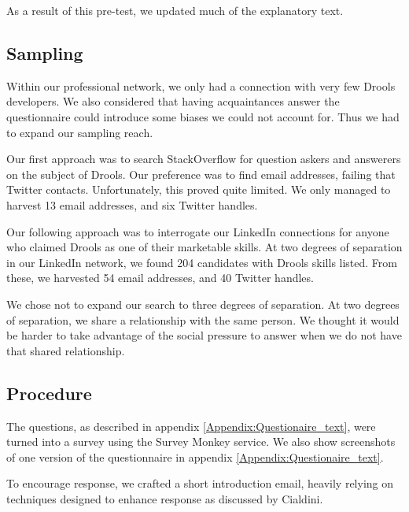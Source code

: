 As a result of this pre-test, we updated much of the explanatory text.

\subsection{Sampling}
Within our professional network, we only had a connection with very few Drools developers.
We also considered that having acquaintances answer the questionnaire could introduce some biases we could not account for.
Thus we had to expand our sampling reach.

Our first approach was to search StackOverflow for question askers and answerers on the subject of Drools.
Our preference was to find email addresses, failing that Twitter contacts.
Unfortunately, this proved quite limited.
We only managed to harvest 13 email addresses, and six Twitter handles.

Our following approach was to interrogate our LinkedIn connections for anyone who claimed Drools as one of their marketable skills.
At two degrees of separation in our LinkedIn network, we found 204 candidates with Drools skills listed.
From these, we harvested 54 email addresses, and 40 Twitter handles.

We chose not to expand our search to three degrees of separation.
At two degrees of separation, we share a relationship with the same person.
We thought it would be harder to take advantage of the social pressure to answer when we do not have that shared relationship.

\subsection{Procedure}

The questions, as described in appendix \ref{Appendix:Questionaire_text}, were turned into a survey using the Survey Monkey service.
We also show screenshots of one version of the questionnaire in appendix \ref{Appendix:Questionaire_text}.

To encourage response, we crafted a short introduction email, heavily relying on techniques designed to enhance response as discussed by  Cialdini\cite{goldstein2008yes}.
